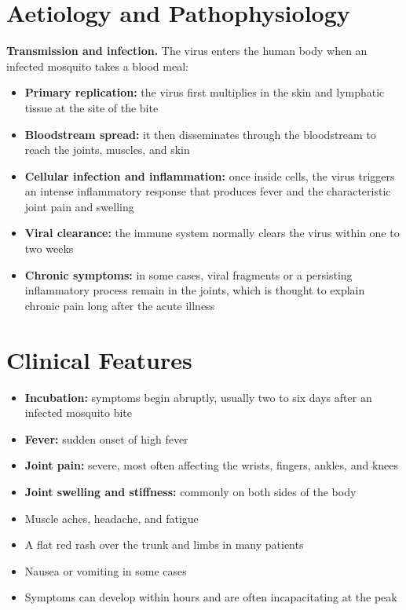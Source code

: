 \section*{Aetiology and Pathophysiology}
\medskip
\textbf{Transmission and infection.} The virus enters the human body when an infected mosquito takes a blood meal:
\begin{itemize}
    \item \textbf{Primary replication:} the virus first multiplies in the skin and lymphatic tissue at the site of the bite
    \item \textbf{Bloodstream spread:} it then disseminates through the bloodstream to reach the joints, muscles, and skin
    \item \textbf{Cellular infection and inflammation:} once inside cells, the virus triggers an intense inflammatory response that produces fever and the characteristic joint pain and swelling
    \item \textbf{Viral clearance:} the immune system normally clears the virus within one to two weeks
    \item \textbf{Chronic symptoms:} in some cases, viral fragments or a persisting inflammatory process remain in the joints, which is thought to explain chronic pain long after the acute illness
\end{itemize}

\section*{Clinical Features}
\begin{itemize}
    \item \textbf{Incubation:} symptoms begin abruptly, usually two to six days after an infected mosquito bite
    \item \textbf{Fever:} sudden onset of high fever
    \item \textbf{Joint pain:} severe, most often affecting the wrists, fingers, ankles, and knees
    \item \textbf{Joint swelling and stiffness:} commonly on both sides of the body
    \item Muscle aches, headache, and fatigue
    \item A flat red rash over the trunk and limbs in many patients
    \item Nausea or vomiting in some cases
    \item Symptoms can develop within hours and are often incapacitating at the peak
\end{itemize}

